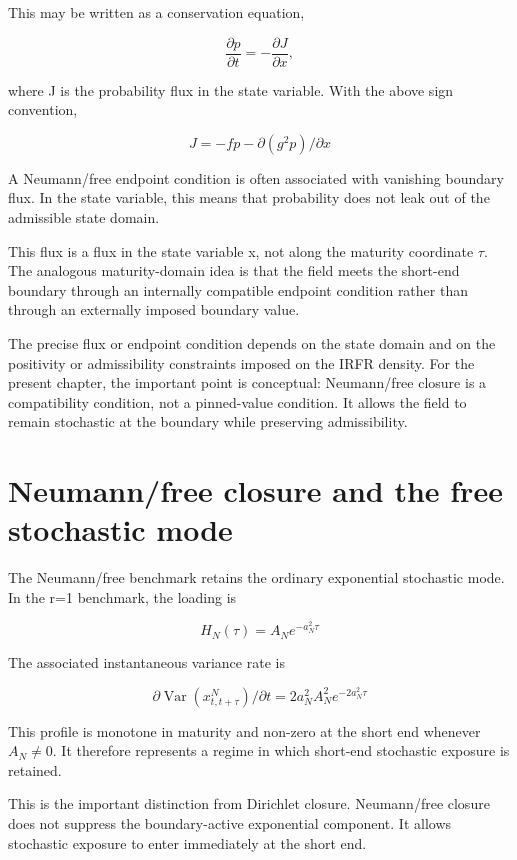 \documentclass[11pt,oneside]{book}
\begin{document}
This may be written as a conservation equation,

\[
\frac{\partial p}{\partial t} = -\frac{\partial J}{\partial x},
\]

where J is the probability flux in the state variable. With the above
sign convention,

\[
J = -fp - \partial(g^2p)/\partial x
\]

A Neumann/free endpoint condition is often associated with vanishing boundary
flux. In the state variable, this means that probability does not leak
out of the admissible state domain.

This flux is a flux in the state variable x, not along the maturity
coordinate $\tau$. The analogous maturity-domain idea is that the field meets
the short-end boundary through an internally compatible endpoint
condition rather than through an externally imposed boundary value.

The precise flux or endpoint condition depends on the state domain and
on the positivity or admissibility constraints imposed on the IRFR
density. For the present chapter, the important point is conceptual:
Neumann/free closure is a compatibility condition, not a pinned-value
condition. It allows the field to remain stochastic at the boundary
while preserving admissibility.

\section{Neumann/free closure and the free stochastic
mode}\label{natural-closure-and-the-free-stochastic-mode}

The Neumann/free benchmark retains the ordinary exponential stochastic
mode. In the r=1 benchmark, the loading is

\[
H_N(\tau) = A_N e^{-a_N^2\tau}
\]

The associated instantaneous variance rate is

\[
\partial \operatorname{Var}(x^N_{t,t+\tau})/\partial t = 2a_N^2 A_N^2 e^{-2a_N^2\tau}
\]

This profile is monotone in maturity and non-zero at the short end
whenever $A_N\neq0$. It therefore represents a regime in which short-end
stochastic exposure is retained.

This is the important distinction from Dirichlet closure. Neumann/free
closure does not suppress the boundary-active exponential component. It
allows stochastic exposure to enter immediately at the short end.
\end{document}
